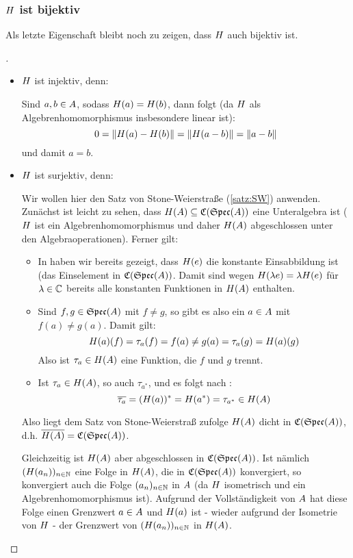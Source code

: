 \subsubsection{$H$ ist bijektiv}\label{sec:Bijektiv}

Als letzte Eigenschaft bleibt noch zu zeigen, dass $H$ auch bijektiv ist.

\begin{proof}[]\ 

\begin{itemize}
\item $H$ ist injektiv, denn:

Sind $a, b \in A$, sodass $H(a) = H(b)$, dann folgt (da $H$ als Algebrenhomomorphismus insbesondere linear ist):
	\[0 = \left\lVert H(a) - H(b)\right\rVert = \left\lVert H(a-b)\right\rVert = \left\lVert a-b\right\rVert\]
und damit $a = b$.

\item $H$ ist surjektiv, denn:

Wir wollen hier den Satz von Stone-Weierstraße (\ref{satz:SW}) anwenden. Zunächst ist leicht zu sehen, dass $H(A) \subseteq \mathfrak{C}(\mathfrak{Spec}(A))$ eine Unteralgebra ist ($H$ ist ein Algebrenhomomorphismus und daher $H(A)$ abgeschlossen unter den Algebraoperationen). Ferner gilt:
\begin{itemize}
	\item In  haben wir bereits gezeigt, dass $H(e)$ die konstante Einsabbildung ist (das Einselement in $\mathfrak{C}(\mathfrak{Spec}(A))$. Damit sind wegen $H(\lambda e) = \lambda H(e)$ für $\lambda \in \mathbb{C}$ bereits alle konstanten Funktionen in $H(A)$ enthalten.
	\item Sind $f, g \in \mathfrak{Spec}(A)$ mit $f \neq g$, so gibt es also ein $a \in A$ mit $f(a) \neq g(a)$. Damit gilt:
		\[H(a)(f) = \tau_a(f) = f(a) \neq g(a) = \tau_a(g) = H(a)(g)\]
		Also ist $\tau_a \in H(A)$ eine Funktion, die $f$ und $g$ trennt.
	\item Ist $\tau_a \in H(A)$, so auch $\tau_{a^*}$, und es folgt nach :
		\[\overline{\tau_a} = (H(a))^* = H(a^*) = \tau_{a^*} \in H(A)\]
\end{itemize}
Also liegt dem Satz von Stone-Weierstraß zufolge $H(A)$ dicht in $\mathfrak{C}(\mathfrak{Spec}(A))$, d.h. $\overline{H(A)} = \mathfrak{C}(\mathfrak{Spec}(A))$.

Gleichzeitig ist $H(A)$ aber abgeschlossen in $\mathfrak{C}(\mathfrak{Spec}(A))$. Ist nämlich $(H(a_n))_{n\in\mathbb{N}}$ eine Folge in $H(A)$, die in $\mathfrak{C}(\mathfrak{Spec}(A))$ konvergiert, so konvergiert auch die Folge $(a_n)_{n\in\mathbb{N}}$ in $A$ (da $H$ isometrisch und ein Algebrenhomomorphismus ist). Aufgrund der Vollständigkeit von $A$ hat diese Folge einen Grenzwert $a \in A$ und $H(a)$ ist - wieder aufgrund der Isometrie von $H$ - der Grenzwert von $(H(a_n))_{n\in\mathbb{N}}$ in $H(A)$. 


\end{itemize}
\end{proof}
